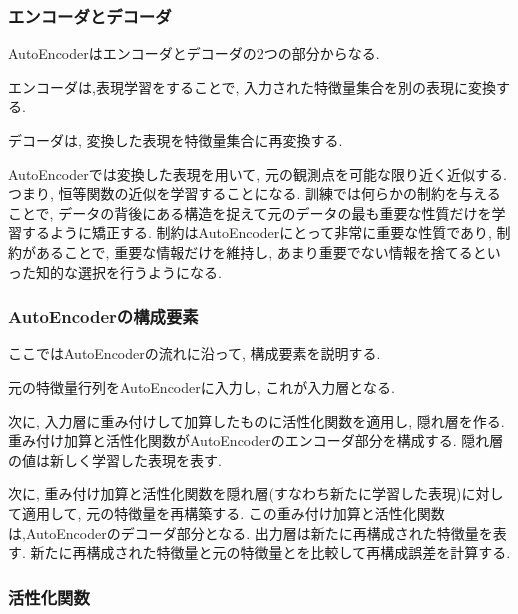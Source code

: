 \documentclass[dvipdfmx]{jsarticle}
\newcommand{\Add}[1]{\textcolor{red}{#1}}
\begin{document}
\subsubsection{エンコーダとデコーダ}
AutoEncoderはエンコーダとデコーダの2つの部分からなる.

エンコーダは,表現学習をすることで, 入力された特徴量集合を別の表現に変換する.

デコーダは, 変換した表現を特徴量集合に再変換する.

AutoEncoderでは変換した表現を用いて, 元の観測点を可能な限り近く近似する.
つまり, 恒等関数の近似を学習することになる.
訓練では何らかの制約を与えることで, データの背後にある構造を捉えて元のデータの最も重要な性質だけを学習するように矯正する.
制約はAutoEncoderにとって非常に重要な性質であり, 制約があることで, 重要な情報だけを維持し, あまり重要でない情報を捨てるといった知的な選択を行うようになる.




\subsubsection{AutoEncoderの構成要素}

ここではAutoEncoderの流れに沿って, 構成要素を説明する.

元の特徴量行列をAutoEncoderに入力し, これが入力層となる.

次に, 入力層に重み付けして加算したものに活性化関数を適用し, 隠れ層を作る.
重み付け加算と活性化関数がAutoEncoderのエンコーダ部分を構成する.
隠れ層の値は新しく学習した表現を表す.

次に, 重み付け加算と活性化関数を隠れ層(すなわち新たに学習した表現)に対して適用して, 元の特徴量を再構築する.
この重み付け加算と活性化関数は,AutoEncoderのデコーダ部分となる.
出力層は新たに再構成された特徴量を表す.
新たに再構成された特徴量と元の特徴量とを比較して再構成誤差を計算する.


\subsubsection{活性化関数}
\end{document}
